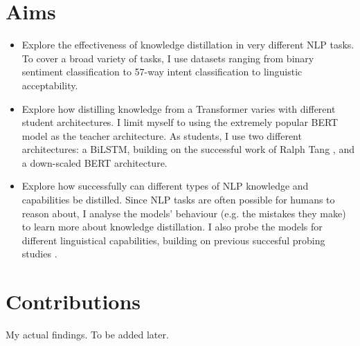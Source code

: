 \documentclass[bsc,frontabs,twoside,singlespacing,parskip,deptreport]{infthesis}
\begin{document}
{  \section{Aims}{
    \begin{itemize}
      \item Explore the effectiveness of knowledge distillation in very different NLP tasks. To cover a broad variety of tasks, I use datasets ranging from binary sentiment classification to 57-way intent classification to linguistic acceptability.
      \item Explore how distilling knowledge from a Transformer varies with different student architectures. I limit myself to using the extremely popular BERT model \citep{Devlin_2018} as the teacher architecture. As students, I use two different architectures: a BiLSTM, building on the successful work of Ralph Tang \citep{Tang-et-al-2019a,Tang-et-al-2019b}, and a down-scaled BERT architecture.
      \item Explore how successfully can different types of NLP knowledge and capabilities be distilled. Since NLP tasks are often possible for humans to reason about, I analyse the models' behaviour (e.g. the mistakes they make) to learn more about knowledge distillation. I also probe the models for different linguistical capabilities, building on previous succesful probing studies \citep{Conneau-et-al-2018,Tenney-et-al-2019}.
    \end{itemize}
  }
  
  \section{Contributions}{
    My actual findings. To be added later.
  }
}
\end{document}
